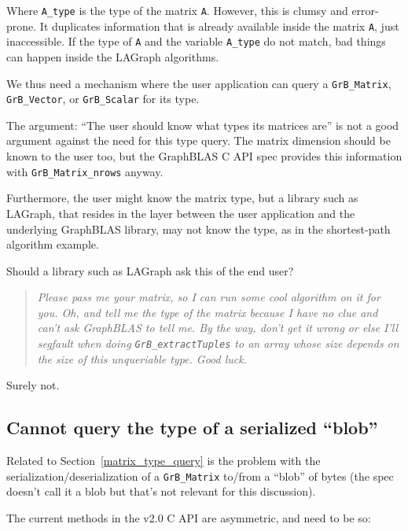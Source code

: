 \documentclass[12pt]{article}
\begin{document}
Where \verb'A_type' is the type of the matrix \verb'A'.  However, this is
clumsy and error-prone.  It duplicates information that is already available
inside the matrix \verb'A', just inaccessible.  If the type of \verb'A' and
the variable \verb'A_type' do not match, bad things can happen inside the
LAGraph algorithms.

We thus need a mechanism where the user application can query a
\verb'GrB_Matrix',
\verb'GrB_Vector', or
\verb'GrB_Scalar' for its type.

The argument: ``The user should know what types its matrices are''
is not a good argument against the need for this type query.
The matrix dimension should be known to the user too, but the GraphBLAS
C API spec provides this information with \verb'GrB_Matrix_nrows' anyway.

Furthermore, the user might know the matrix type, but a library such
as LAGraph, that resides in the layer between the user application and
the underlying GraphBLAS library, may not know the type, as in the
shortest-path algorithm example.

Should a library such as LAGraph ask this of the end user? 

\begin{quote}
{\em Please pass me your matrix, so I can run some cool algorithm on it
for you.  Oh, and tell me the type of the matrix because I have no
clue and can't ask GraphBLAS to tell me.  By the way, don't get it wrong or
else I'll segfault when doing \verb'GrB_extractTuples' to an array whose size
depends on the size of this unqueriable type. Good luck.}
\end{quote}

Surely not.

\subsection{Cannot query the type of a serialized ``blob''}
\label{blob_type_query}

Related to Section~\ref{matrix_type_query} is the problem with the
serialization/deserialization of a \verb'GrB_Matrix' to/from a ``blob'' of
bytes (the spec doesn't call it a blob but that's not relevant for this
discussion).

The current methods in the v2.0 C API are asymmetric, and need to be so:
\end{document}
